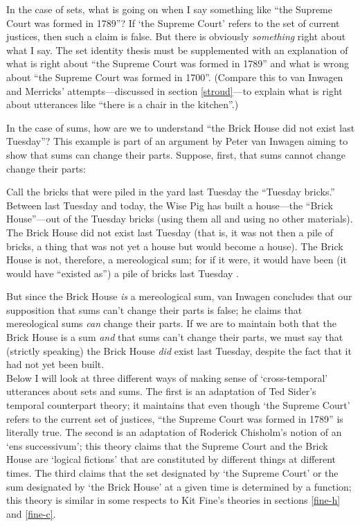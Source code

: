 \documentclass[11pt]{article}
\newenvironment{squote}{%
\begin{spacing}{1}
\begin{list}{}{%
\setlength{\labelwidth}{0pt}%
\rightmargin\leftmargin%
}
\item\relax
}{%
\end{list}%
\end{spacing}
}
\begin{document}
\begin{spacing}{1.5}
In the case of sets, what is going on when I say something like ``the
Supreme Court was formed in 1789''?  If `the Supreme Court' refers to
the set of current justices, then such a claim is false.  But there is
obviously {\em something} right about what I say.  The set identity
thesis must be supplemented with an explanation of what is right about
``the Supreme Court was formed in 1789'' and what is wrong about ``the
Supreme Court was formed in 1700''.  (Compare this to van Inwagen and
Merricks' attempts---discussed in section \ref{stroud}---to explain
what is right about utterances like ``there is a chair in the
kitchen''.)

In the case of sums, how are we to understand ``the Brick House did
not exist last Tuesday''?  This example is part of an argument by
Peter van Inwagen aiming to show that sums can change their parts.
Suppose, first, that sums cannot change change their parts:

\begin{squote}
Call the bricks that were piled in the yard last Tuesday the ``Tuesday
bricks.''  Between last Tuesday and today, the Wise Pig has built a
house---the ``Brick House''---out of the Tuesday bricks (using them
all and using no other materials).  The Brick House did not exist last
Tuesday (that is, it was not then a pile of bricks, a thing that was
not yet a house but would become a house).  The Brick House is not,
therefore, a mereological sum; for if it were, it would have been (it
would have ``existed as'') a pile of bricks last Tuesday
\citeyearpar[616]{inwagen2006}.
\end{squote}

But since the Brick House {\em is} a mereological sum, van Inwagen
concludes that our supposition that sums can't change their parts is
false; he claims that mereological sums {\em can} change their parts.
If we are to maintain both that the Brick House is a sum {\em and}
that sums can't change their parts, we must say that (strictly
speaking) the Brick House {\em did} exist last Tuesday, despite the
fact that it had not yet been built. \\

Below I will look at three different ways of making sense of
`cross-temporal' utterances about sets and sums.  The first is an
adaptation of Ted Sider's temporal counterpart theory; it maintains
that even though `the Supreme Court' refers to the current set of
justices, ``the Supreme Court was formed in 1789'' is literally true.
The second is an adaptation of Roderick Chisholm's notion of an `ens
successivum'; this theory claims that the Supreme Court and the Brick
House are `logical fictions' that are constituted by different things
at different times.  The third claims that the set designated by `the
Supreme Court' or the sum designated by `the Brick House' at a given
time is determined by a function; this theory is similar in some
respects to Kit Fine's theories in sections \ref{fine-h} and
\ref{fine-c}.


\end{spacing}
\end{document}
